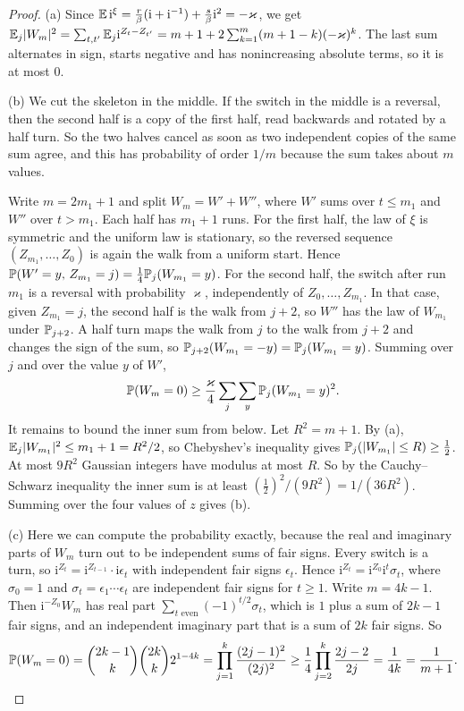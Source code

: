 \begin{proof}
(a) Since $\mathbb{E}\,\mathrm i^\xi=\frac r\beta(\mathrm i+\mathrm i^{-1})+\frac s\beta\mathrm i^2=-\varkappa$,
we get $\mathbb{E}_j\lvert W_m\rvert^2=\sum_{t,t'}\mathbb{E}_j\mathrm i^{Z_t-Z_{t'}}
=m+1+2\sum_{k=1}^m(m+1-k)(-\varkappa)^k$. The last sum alternates in sign, starts negative and
has nonincreasing absolute terms, so it is at most $0$.

(b) We cut the skeleton in the middle. If the switch in the middle is a reversal, then the second
half is a copy of the first half, read backwards and rotated by a half turn. So the two halves
cancel as soon as two independent copies of the same sum agree, and this has probability of order
$1/m$ because the sum takes about $m$ values.

Write $m=2m_1+1$ and split $W_m=W'+W''$, where $W'$ sums over $t\le m_1$ and $W''$ over $t>m_1$.
Each half has $m_1+1$ runs. For the first half, the law of $\xi$ is symmetric and the uniform law
is stationary, so the reversed sequence $(Z_{m_1},\dots,Z_0)$ is again the walk from a uniform
start. Hence $\mathbb{P}(W'=y,\,Z_{m_1}=j)=\frac14\mathbb{P}_j(W_{m_1}=y)$. For the second half, the switch
after run $m_1$ is a reversal with probability $\varkappa$, independently of $Z_0,\dots,Z_{m_1}$.
In that case, given $Z_{m_1}=j$, the second half is the walk from $j+2$, so $W''$ has the law of
$W_{m_1}$ under $\mathbb{P}_{j+2}$. A half turn maps the walk from $j$ to the walk from $j+2$ and
changes the sign of the sum, so $\mathbb{P}_{j+2}(W_{m_1}=-y)=\mathbb{P}_j(W_{m_1}=y)$. Summing over $j$ and
over the value $y$ of $W'$,
\[
 \mathbb{P}(W_m=0)\ge\frac\varkappa4\sum_j\sum_y\mathbb{P}_j(W_{m_1}=y)^2 .
\]
It remains to bound the inner sum from below. Let $R^2=m+1$. By (a),
$\mathbb{E}_j\lvert W_{m_1}\rvert^2\le m_1+1=R^2/2$, so Chebyshev's inequality gives
$\mathbb{P}_j(\lvert W_{m_1}\rvert\le R)\ge\frac12$. At most $9R^2$ Gaussian integers have modulus at
most $R$. So by the Cauchy--Schwarz inequality the inner sum is at least
$(\frac12)^2/(9R^2)=1/(36R^2)$. Summing over the four values of $z$ gives (b).

(c) Here we can compute the probability exactly, because the real and imaginary parts of $W_m$
turn out to be independent sums of fair signs. Every switch is a turn, so
$\mathrm i^{Z_t}=\mathrm i^{Z_{t-1}}\cdot\mathrm i\epsilon_t$ with
independent fair signs $\epsilon_t$. Hence $\mathrm i^{Z_t}=\mathrm i^{Z_0}\mathrm i^t\sigma_t$, where
$\sigma_0=1$ and $\sigma_t=\epsilon_1\cdots\epsilon_t$ are independent fair signs for $t\ge1$. Write
$m=4k-1$. Then $\mathrm i^{-Z_0}W_m$ has real part $\sum_{t\text{ even}}(-1)^{t/2}\sigma_t$, which is
$1$ plus a sum of $2k-1$ fair signs, and an independent imaginary part that is a sum of $2k$ fair
signs. So
\[
 \mathbb{P}(W_m=0)=\binom{2k-1}k\binom{2k}k2^{1-4k}=\prod_{j=1}^k\frac{(2j-1)^2}{(2j)^2}
 \ge\frac14\prod_{j=2}^k\frac{2j-2}{2j}=\frac1{4k}=\frac1{m+1}.
\]
\end{proof}

